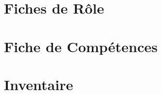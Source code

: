 \documentclass[asi]{picINSA}
\begin{document}
\begin{appendix}
\chapter{Fiches de Rôle}
\label{annexeFRo}
	

\chapter{Fiche de Compétences}
\label{annexeFC}


\chapter{Inventaire}
\label{annexeInventaire}

	
\listoffigures
{}
	 
\listoftables
{}
\end{appendix}
\pageQuatriemeCouverture
\end{document}
